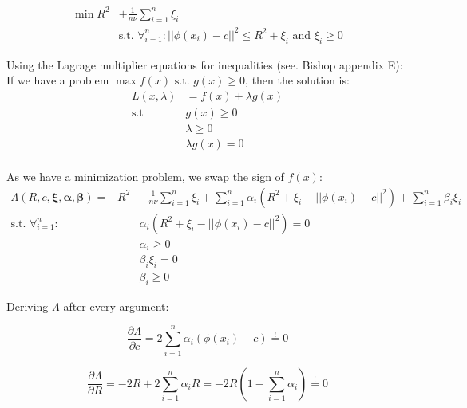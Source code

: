 \begin{align}
    \min R^2  & + \frac{1}{n \nu} \sum_{i=1}^n \xi_i \\
              & \text{s.t. } \forall_{i=1}^n: || \phi(x_i) - c||^2 \le R^2 + \xi_i
              \text{ and } \xi_i \ge 0
\end{align}

Using the Lagrage multiplier equations for inequalities (see. Bishop appendix E):
If we have a problem $ \max  f(x)  \textrm{  s.t. } g(x) \ge 0$, then the solution is:
\begin{equation}
    \begin{split}
        L(x, \lambda) & = f(x) + \lambda g(x) \\
        \textrm{s.t } & g(x) \ge 0 \\
                      & \lambda \ge 0 \\
                      & \lambda g(x) = 0 \\
    \end{split}
\end{equation}

As we have a minimization problem, we swap the sign of $f(x)$:
\begin{align}
    \label{eq:lagrange}
    \Lambda(R, c, \bm{\xi}, \bm{\alpha}, \bm{\beta}) = - R^2  & - \frac{1}{n \nu} \sum_{i=1}^n \xi_i
               + \sum_{i=1}^n \alpha_i \left( R^2 + \xi_i - ||\phi(x_i) - c||^2 \right)
            +  \sum_{i=1}^n \beta_i \xi_i \\
        \text{s.t. } \forall_{i=1}^n:& \alpha_i \left( R^2 + \xi_i  - ||\phi(x_i) - c||^2 \right) = 0 \\
                   &  \alpha_i \ge 0 \\
        \label{eq:lbeta_xi}
                   &  \beta_i \xi_i = 0 \\
                   &  \beta_i \ge 0
\end{align}


Deriving $\Lambda$ after every argument:

\begin{equation}
    \label{eq:dc}
    \frac{\partial \Lambda}{\partial c} =
               2 \sum_{i=1}^n \alpha_i \left(\phi(x_i) - c \right) \stackrel{!}{=} 0
\end{equation}

\begin{equation}
    \label{eq:dR}
    \frac{\partial \Lambda}{\partial R} =
        - 2 R + 2 \sum_{i=1}^n \alpha_i R =
        - 2 R \left( 1 - \sum_{i=1}^n \alpha_i \right) \stackrel{!}{=} 0
\end{equation}

